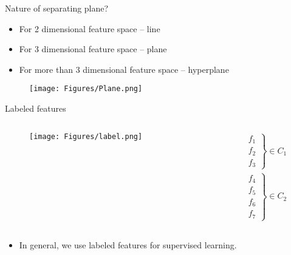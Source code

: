 \begin{frame}{Nature of separating plane?}
\begin{itemize}
\item For 2 dimensional feature space -- {\color{maroon}line}
\item For 3 dimensional feature space -- {\color{maroon}plane}
\item For more than 3 dimensional feature space -- {\color{maroon}hyperplane}
\end{itemize}
\begin{figure}
\texttt{[image: Figures/Plane.png]}
\end{figure}
\end{frame}

\begin{frame}{Labeled features}
\begin{columns}
\begin{column}{5cm}
\begin{figure}
\texttt{[image: Figures/label.png]}
\end{figure}
\end{column}
\begin{column}{5cm}
\[\begin{array}{*{20}{c}}
{\left. {\begin{array}{*{20}{c}}
{{f_1}}\\
{{f_2}}\\
{{f_3}}
\end{array}} \right\} \in {C_1}}\\
{\left. {\begin{array}{*{20}{c}}
{{f_4}}\\
{{f_5}}\\
{{f_6}}\\
{{f_7}}
\end{array}} \right\} \in {C_2}}
\end{array}\]
\end{column}
\end{columns}
\begin{itemize}
\item In general, we use labeled features for supervised learning.
\end{itemize}
\end{frame}

